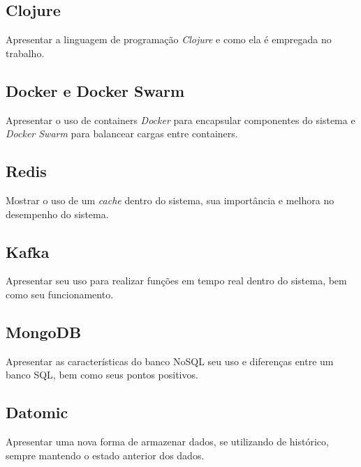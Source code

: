 \subsection{Clojure}
Apresentar a linguagem de programação \textit{Clojure} e como ela é empregada no trabalho.

\subsection{Docker e Docker Swarm}
Apresentar o uso de containers \textit{Docker} para encapsular componentes do sistema e \textit{Docker Swarm} para balancear cargas entre containers.

\subsection{Redis}
Mostrar o uso de um \textit{cache} dentro do sistema, sua importância e melhora no desempenho do sistema.

\subsection{Kafka}
Apresentar seu uso para realizar funções em tempo real dentro do sistema, bem como seu funcionamento.

\subsection{MongoDB}
Apresentar as características do banco NoSQL seu uso e diferenças entre um banco SQL, bem como seus pontos positivos.

\subsection{Datomic}
Apresentar uma nova forma de armazenar dados, se utilizando de histórico, sempre mantendo o estado anterior dos dados.

